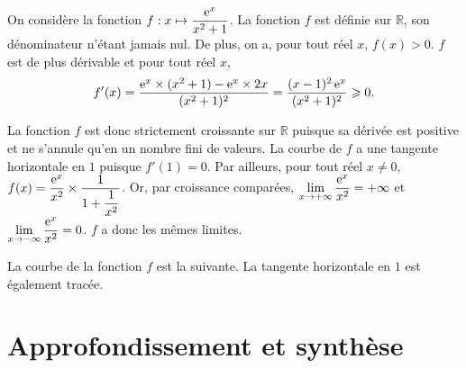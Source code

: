 \documentclass[11pt,fleqn, openany]{book} %
\begin{document}
\begin{solution}
On considère la fonction $f:x\mapsto \dfrac{\mathrm{e}^x}{x^2+1}$. La fonction $f$ est définie sur $\mathbb{R}$, son dénominateur n'étant jamais nul. De plus, on a, pour tout réel $x$, $f(x)>0$. $f$ est de plus dérivable et pour tout réel $x$, 
\[ f'(x)= \dfrac{\mathrm{e}^x \times (x^2+1) - \mathrm{e}^x \times 2x}{(x^2+1)^2}=\dfrac{(x-1)^2\,\mathrm{e}^x}{(x^2+1)^2}\geqslant 0.\]

La fonction $f$ est donc strictement croissante sur $\mathbb{R}$ puisque sa dérivée est positive et ne s'annule qu'en un nombre fini de valeurs. La courbe de $f$ a une tangente horizontale en $1$ puisque $f'(1)=0$. Par ailleurs, pour tout réel $x\neq 0$, $f(x)=\dfrac{\mathrm{e}^x}{x^2} \times \dfrac{1}{1+\dfrac{1}{x^2}}$. Or, par croissance comparées, $\displaystyle\lim_{x \to +\infty} \dfrac{\mathrm{e}^x}{x^2}=+\infty$ et $\displaystyle\lim_{x \to -\infty} \dfrac{\mathrm{e}^x}{x^2}=0$. $f$ a donc les mêmes limites.

La courbe de la fonction $f$ est la suivante. La tangente horizontale en $1$ est également tracée.


\begin{center}\end{center}

\end{solution}



\section*{Approfondissement et synthèse}
\end{document}
